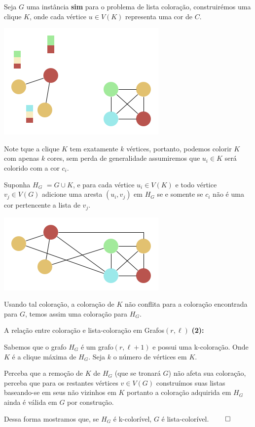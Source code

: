 \documentclass[9pt, compress]{beamer}
\begin{document}
    \begin{frame}
      Seja $G$ uma instância \textbf{sim} para o problema de lista coloração, construirémos uma clique $K$, onde cada vértice $u \in V(K)$ representa uma cor de $C$.
      \begin{center}
        \includegraphics[scale=0.4]{presentation-K.png}
      \end{center}
      Note tque a clique $K$ tem exatamente $k$ vértices, portanto, podemos colorir $K$ com apenas $k$ cores, sem perda de generalidade assumiremos que $u_i \in K$ será colorido com a cor $c_i$.
    \end{frame}
    \begin{frame}  
      Suponha $H_G$ $= G \cup K$, e para cada vértice $u_i \in V(K)$ e todo vértice $v_j \in V(G)$ adicione uma aresta $(u_i,v_j) $ em $H_G$ se e somente se $c_i$ não é uma cor pertencente a lista de $v_j$.
      \begin{center}
        \includegraphics[scale=0.4]{presentation-H.png}
      \end{center}   
      Usando tal coloração, a coloração de $K$ não conflita para a coloração encontrada para $G$, temos assim uma coloração para $H_G$. 
    \end{frame}
    \begin{frame}{A relação entre coloração e lista-coloração em Grafos$(r,\ell)$}
      \textbf{(2):}
      
      Sabemos que o grafo $H_G$ é um grafo$(r,\ell+1)$ e possui uma k-coloração. Onde $K$ é a clique máxima de $H_G$.
      Seja $k$ o número de vértices em $K$.
      
      Perceba que a remoção de $K$ de $H_G$ (que se tronará $G$) não afeta sua coloração, perceba que para os restantes vértices $v \in V(G)$ construímos suas listas baseando-se em seus não vizinhos em $K$ portanto a coloração adquirida em $H_G$ ainda é válida em $G$ por construção.
      
      Dessa forma mostramos que, se $H_G$ é k-colorível, $G$ é lista-colorível.
      $\qed$
    \end{frame}
\end{document}
